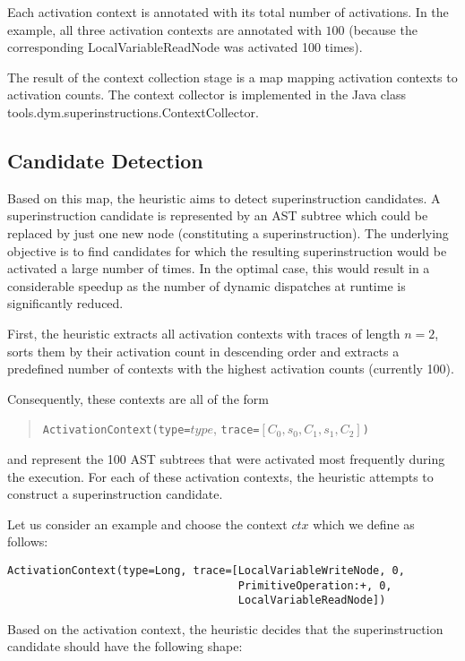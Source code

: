 \documentclass[10pt,a4paper]{article}
\begin{document}
Each activation context is annotated with its total number of activations. In the example, all three activation contexts are annotated with $100$ (because the corresponding \textsf{LocalVariableReadNode} was activated 100 times). 

The result of the context collection stage is a map mapping activation contexts to activation counts. The context collector is implemented in the Java class \textsf{tools.dym.superinstructions.ContextCollector}.

\subsection{Candidate Detection}

Based on this map, the heuristic aims to detect superinstruction candidates. A superinstruction candidate is represented by an AST subtree which could be replaced by just one new node (constituting a superinstruction). The underlying objective is to find candidates for which the resulting superinstruction would be activated a large number of times. In the optimal case, this would result in a considerable speedup as the number of dynamic dispatches at runtime is significantly reduced.

First, the heuristic extracts all activation contexts with traces of length $n = 2$, sorts them by their activation count in descending order and extracts a predefined number of contexts with the highest activation counts (currently 100).

Consequently, these contexts are all of the form

\begin{quotation}
\verb|ActivationContext(type=|$type$, \verb|trace=|$[C_0, s_0, C_1, s_1, C_2]$\verb|)|
\end{quotation}
and represent the 100 AST subtrees that were activated most frequently during the execution. For each of these activation contexts, the heuristic attempts to construct a superinstruction candidate.

Let us consider an example and choose the context $ctx$ which we define as follows:

\begin{verbatim}
ActivationContext(type=Long, trace=[LocalVariableWriteNode, 0,
                                    PrimitiveOperation:+, 0,
                                    LocalVariableReadNode])
\end{verbatim}

Based on the activation context, the heuristic decides that the superinstruction candidate should have the following shape:
\end{document}

